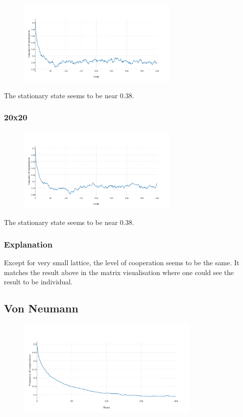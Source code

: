 \documentclass[11pt]{article}
\begin{document}
\begin{figure}[H]
\centering
   \includegraphics[width=0.7\textwidth]{img/part2/part2-moore-12-12.png}
\end{figure}
The stationary state seems to be near $0.38$. 

\subsubsection{20x20}

\begin{figure}[H]
\centering
   \includegraphics[width=0.7\textwidth]{img/part2/part2-moore-20-20.png}
\end{figure}

The stationary state seems to be near $0.38$. 

\subsubsection{Explanation}

Except for very small lattice, the level of cooperation seems to be the same. It matches the result above in the matrix visualisation where one could see the result to be individual.

\subsection{Von Neumann}

\begin{figure}[H]
\centering
   \includegraphics[width=0.8\textwidth]{img/part2/part2-vonn-notmyself.png}
\end{figure}
\end{document}
